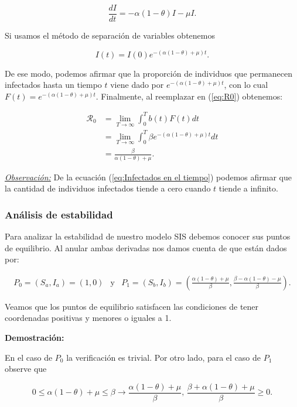 \begin{equation}\label{eq:Cambio en I}
\frac{dI}{dt} = -\alpha(1-\theta)I-\mu I.
\end{equation}

Si usamos el método de separación de variables obtenemos

\begin{equation}\label{eq:Infectados en el tiempo}
I(t) = I(0)e^{-(\alpha(1-\theta)+\mu)t}.
\end{equation}

De ese modo, podemos afirmar que la proporción de individuos que permanecen infectados hasta un tiempo $t$ viene dado por $e^{-(\alpha(1-\theta)+\mu)t}$, con lo cual $F(t)=e^{-(\alpha(1-\theta)+\mu)t}$. Finalmente, al reemplazar en (\ref{eq:R0}) obtenemos:

\begin{align*}
\mathcal{R}_0 &= \lim_{T\to\infty}\int_0^T b(t)F(t) dt \\
&= \lim_{T\to\infty}\int_0^T \beta e^{-(\alpha(1-\theta)+\mu)t} dt\\
&= \frac{\beta}{\alpha(1-\theta)+\mu}.
\end{align*}

\underline{\textit{Observación:}} De la ecuación (\ref{eq:Infectados en el tiempo}) podemos afirmar que la cantidad de individuos infectados tiende a cero cuando $t$ tiende a infinito.

\subsubsection{Análisis de estabilidad}

Para analizar la estabilidad de nuestro modelo SIS debemos conocer sus puntos de equilibrio. Al anular ambas derivadas nos damos cuenta de que están dados por:

$$\begin{array}{ccc}
    P_0=(S_a,I_a)=(1,0) & \text{y} & P_1=(S_b,I_b)=\left(\frac{\alpha(1-\theta)+\mu}{\beta},\frac{\beta-\alpha(1-\theta)-\mu}{\beta}\right).
\end{array}$$

Veamos que los puntos de equilibrio satisfacen las condiciones de tener coordenadas positivas y menores o iguales a 1.

\textbf{Demostración:}

En el caso de $P_0$ la verificación es trivial. Por otro lado, para el caso de $P_1$ observe que 

$$0\leq\alpha(1-\theta)+\mu\leq\beta \longrightarrow \frac{\alpha(1-\theta)+\mu}{\beta}\text{, }\frac{\beta+\alpha(1-\theta)+\mu}{\beta}\geq0.$$

